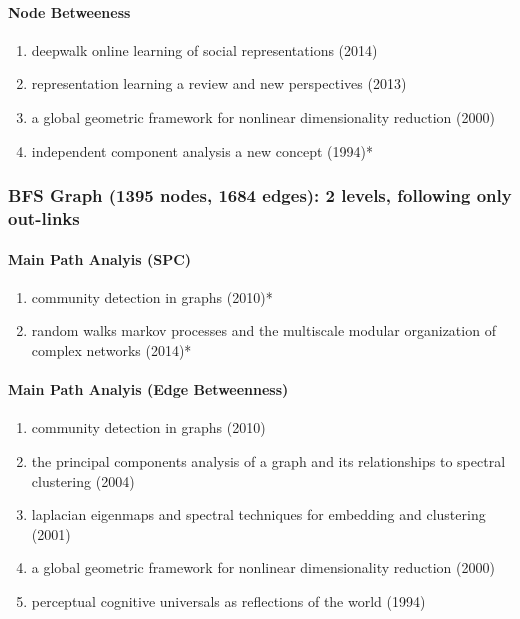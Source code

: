 \documentclass[lettepaper,]{article}
\providecommand{\tightlist}{%
  \setlength{\itemsep}{0pt}\setlength{\parskip}{0pt}}
\let\oldparagraph\paragraph
\renewcommand{\paragraph}[1]{\oldparagraph{#1}\mbox{}}
\begin{document}
\hypertarget{node-betweeness}{%
\paragraph{Node Betweeness}\label{node-betweeness}}

\begin{enumerate}
\def\labelenumi{\arabic{enumi}.}
\tightlist
\item
  deepwalk online learning of social representations (2014)
\item
  representation learning a review and new perspectives (2013)
\item
  a global geometric framework for nonlinear dimensionality reduction
  (2000)
\item
  independent component analysis a new concept (1994)*
\end{enumerate}

\hypertarget{bfs-graph-1395-nodes-1684-edges-2-levels-following-only-out-links-1}{%
\subsubsection{BFS Graph (1395 nodes, 1684 edges): 2 levels, following
only
out-links}\label{bfs-graph-1395-nodes-1684-edges-2-levels-following-only-out-links-1}}

\hypertarget{main-path-analyis-spc-1}{%
\paragraph{Main Path Analyis (SPC)}\label{main-path-analyis-spc-1}}

\begin{enumerate}
\def\labelenumi{\arabic{enumi}.}
\tightlist
\item
  community detection in graphs (2010)*
\item
  random walks markov processes and the multiscale modular organization
  of complex networks (2014)*
\end{enumerate}

\hypertarget{main-path-analyis-edge-betweenness-1}{%
\paragraph{Main Path Analyis (Edge
Betweenness)}\label{main-path-analyis-edge-betweenness-1}}

\begin{enumerate}
\def\labelenumi{\arabic{enumi}.}
\tightlist
\item
  community detection in graphs (2010)
\item
  the principal components analysis of a graph and its relationships to
  spectral clustering (2004)
\item
  laplacian eigenmaps and spectral techniques for embedding and
  clustering (2001)
\item
  a global geometric framework for nonlinear dimensionality reduction
  (2000)
\item
  perceptual cognitive universals as reflections of the world (1994)
\end{enumerate}
\end{document}
